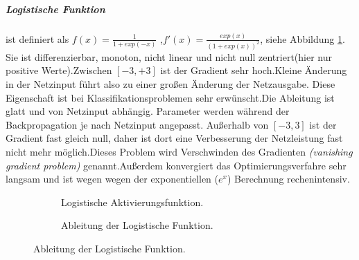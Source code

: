 \documentclass[12pt,a4paper]{scrartcl}
\numberwithin{equation}{section}
\begin{document}
\subparagraph{Logistische Funktion} ist definiert als $f(x)=\frac{1}{1+exp(-x)} $ ,$ f'(x)= \frac{exp(x)}{(1+exp(x))^2}$, siehe Abbildung \ref{fig:sigmoid}. Sie ist differenzierbar, monoton, nicht linear und nicht null zentriert(hier nur positive Werte).Zwischen $ [-3,+3] $ ist der Gradient sehr hoch.Kleine Änderung in der Netzinput führt also zu einer großen Änderung der Netzausgabe. Diese Eigenschaft ist bei Klassifikationsproblemen sehr erwünscht.Die Ableitung ist glatt und von Netzinput abhängig. Parameter werden während der Backpropagation je nach Netzinput angepasst.
Außerhalb von $ [-3,3]  $ ist der Gradient fast gleich null, daher ist dort eine Verbesserung der Netzleistung fast nicht mehr möglich.Dieses Problem wird Verschwinden des Gradienten \textit{(vanishing gradient problem)} genannt.Außerdem konvergiert das Optimierungsverfahre sehr langsam und ist wegen wegen der exponentiellen  ($ e^x $) Berechnung rechenintensiv.
\begin{figure}[h]
	\caption{Logistische Aktivierungsfunktion:$ sigmoid(x) $.}
	\centering
	\begin{subfigure}{.5\textwidth}	
		\centering	
		\caption{Logistische Aktivierungsfunktion.}
		
	\end{subfigure}%
	\begin{subfigure}{.5\textwidth}	
		\centering	
		\caption{Ableitung der Logistische Funktion.}
	\end{subfigure}
	\label{fig:sigmoid}
	
\end{figure}
\end{document}
